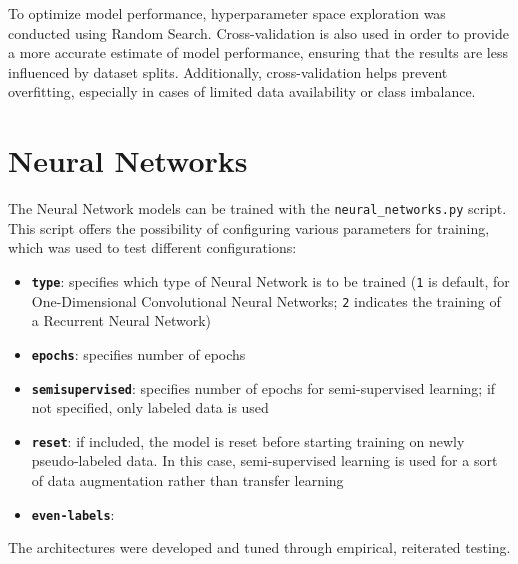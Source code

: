 To optimize model performance, hyperparameter space exploration was conducted
using Random Search.
Cross-validation is also used in order to provide a more accurate
estimate of model performance, ensuring that the results are less influenced
by dataset splits. Additionally, cross-validation helps prevent overfitting,
especially in cases of limited data availability or class imbalance. 



\section*{Neural Networks}
The Neural Network models can be trained with the \texttt{neural\_networks.py}
script. This script offers the possibility of configuring various parameters for
training, which was used to test different configurations:
\begin{itemize}
    \item \textbf{\texttt{type}}: specifies which type of Neural
    Network is to be trained (\texttt{1} is default, for One-Dimensional
    Convolutional Neural Networks; \texttt{2} indicates the training of a
    Recurrent Neural Network)

    \item \textbf{\texttt{epochs}}: specifies number of epochs

    \item \textbf{\texttt{semisupervised}}: specifies number of epochs
    for semi-supervised learning; if not specified, only labeled data is used

    \item \textbf{\texttt{reset}}: if included, the model is reset before
    starting training on newly pseudo-labeled data. In this case, semi-supervised
    learning is used for a sort of data augmentation rather than transfer
    learning

    \item \textbf{\texttt{even-labels}}:

\end{itemize}

The architectures were developed and tuned through empirical,
reiterated testing.\\


